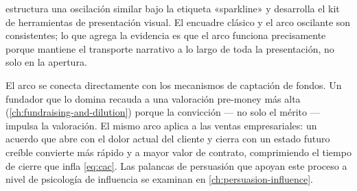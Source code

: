 \textcite{duarte2010resonate} estructura una oscilación similar bajo la etiqueta «sparkline»
y desarrolla el kit de herramientas de presentación visual. El encuadre clásico y el arco
oscilante son consistentes; lo que agrega la evidencia es que el arco funciona precisamente
porque mantiene el transporte narrativo a lo largo de toda la presentación, no solo en la
apertura.

El arco se conecta directamente con los mecanismos de captación de fondos. Un fundador que
lo domina recauda a una valoración pre-money más alta (\cref{ch:fundraising-and-dilution})
porque la convicción — no solo el mérito — impulsa la valoración. El mismo arco aplica a las
ventas empresariales: un acuerdo que abre con el dolor actual del cliente y cierra con un
estado futuro creíble convierte más rápido y a mayor valor de contrato, comprimiendo el tiempo
de cierre que infla \cref{eq:cac}. Las palancas de persuasión que apoyan este proceso a nivel
de psicología de influencia se examinan en \cref{ch:persuasion-influence}.


